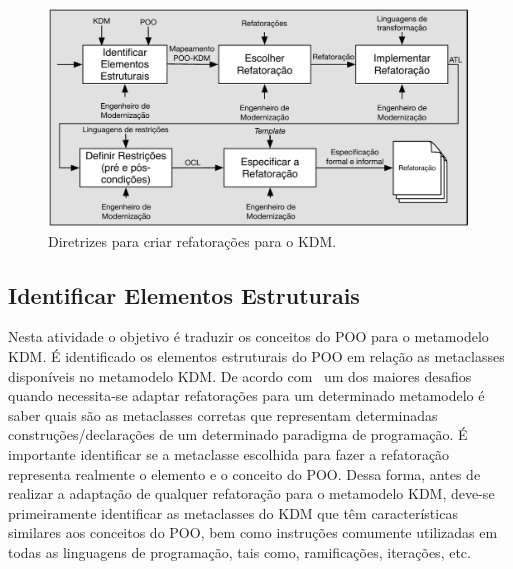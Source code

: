 \begin{figure}[h]
	\centering
	\caption{Diretrizes para criar refatorações para o KDM.}
	\label{fig:todos_os_passos_diretrizes}
	\includegraphics[scale=0.7]{images/fasesParaConstruirRefatoracoesKDM2}
	\fautor
\end{figure}

\subsection{Identificar Elementos Estruturais}\label{sec:mapeamento_POO_e_KDM}

Nesta atividade o objetivo é traduzir os conceitos do POO para o metamodelo KDM. É identificado os elementos estruturais do POO em relação as metaclasses disponíveis no metamodelo KDM. De acordo com~ um dos maiores desafios quando necessita-se adaptar refatorações para um determinado metamodelo é saber quais são as metaclasses corretas que representam determinadas construções/declarações de um determinado paradigma de programação. É importante identificar se a metaclasse escolhida para fazer a refatoração representa realmente o elemento e o conceito do POO. Dessa forma, antes de realizar a adaptação de qualquer refatoração para o metamodelo KDM, deve-se primeiramente identificar as metaclasses do KDM que têm características similares aos conceitos do POO, bem como instruções comumente utilizadas em todas as linguagens de programação, tais como, ramificações, iterações, etc. 

